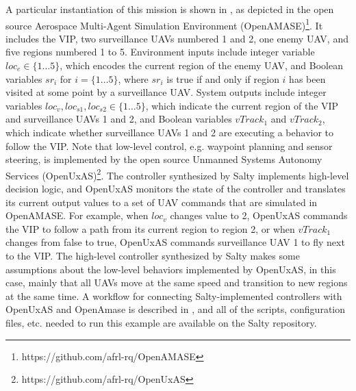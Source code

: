 \documentclass[runningheads]{llncs}
\begin{document}
A particular instantiation of this mission is shown in , as depicted in 
the open source Aerospace Multi-Agent Simulation Environment (OpenAMASE)\footnote{https://github.com/afrl-rq/OpenAMASE}. 
It includes the VIP, two surveillance UAVs numbered 1 and 2, one enemy UAV, and five regions numbered 1 to 5. 
Environment inputs include integer variable $loc_e \in \{1 \dots 5\}$, which encodes the current region of the enemy UAV, 
and Boolean variables $sr_i$ for $i = \{1 \ldots 5\}$, where $sr_i$ is true if and only if region $i$ has been visited at some point by a surveillance UAV. 
System outputs include integer variables $loc_v, loc_{s1}, loc_{s2} \in \{1 \dots 5\}$, which indicate the current region of the 
VIP and surveillance UAVs 1 and 2, and Boolean variables $vTrack_1$ and $vTrack_2$, which indicate whether surveillance UAVs 1 and 2 
are executing a behavior to follow the VIP. 
Note that low-level control, e.g. waypoint planning and sensor steering, 
is implemented by the open source Unmanned Systems Autonomy Services (OpenUxAS)\footnote{https://github.com/afrl-rq/OpenUxAS}. 
The controller synthesized by Salty implements high-level decision logic, 
and OpenUxAS monitors the state of the controller and translates its current output values to a set of UAV commands that are simulated in OpenAMASE.
For example, when $loc_v$ changes value to 2, OpenUxAS commands the VIP to follow a path from its current region to region 2, 
or when $vTrack_1$ changes from false to true, OpenUxAS commands surveillance UAV 1 to fly next to the VIP. 
The high-level controller synthesized by Salty makes some assumptions about the low-level behaviors implemented by OpenUxAS, 
in this case, mainly that all UAVs move at the same speed and transition to new regions at the same time. 
A workflow for connecting Salty-implemented controllers with OpenUxAS and OpenAmase is described in \cite{elliott2019salty}, 
and all of the scripts, configuration files, etc. needed to run this example are available on the Salty repository.


\end{document}
